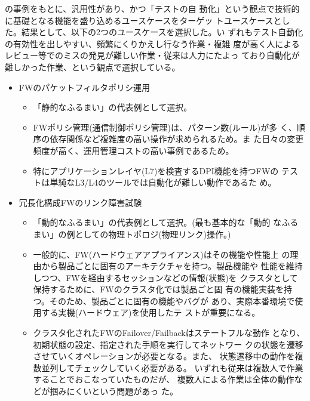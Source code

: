 の事例をもとに、汎用性があり、かつ「テストの自
動化」という観点で技術的に基礎となる機能を盛り込めるユースケースをターゲッ
トユースケースとした。結果として、以下の2つのユースケースを選択した。い
ずれもテスト自動化の有効性を出しやすい、頻繁にくりかえし行なう作業・複雑
度が高く人によるレビュー等でのミスの発見が難しい作業・従来は人力にたよっ
ており自動化が難しかった作業、という観点で選択している。
\begin{itemize}
 \item FWのパケットフィルタポリシ運用
       \begin{itemize}
        \item 「静的なふるまい」の代表例として選択。
        \item FWポリシ管理(通信制御ポリシ管理)は、パターン数(ルール)が多
              く、順序の依存関係など複雑度の高い操作が求められるため。ま
              た日々の変更頻度が高く、運用管理コストの高い事例であるため。
        \item 特にアプリケーションレイヤ(L7)を検査するDPI機能を持つFWの
              テストは単純なL3/L4のツールでは自動化が難しい動作であるた
              め。
       \end{itemize}
 \item 冗長化構成FWのリンク障害試験
       \begin{itemize}
        \item 「動的なふるまい」の代表例として選択。(最も基本的な「動的
              なふるまい」の例としての物理トポロジ(物理リンク)操作。)
        \item 一般的に、FW(ハードウェアアプライアンス)はその機能や性能上
              の理由から製品ごとに固有のアーキテクチャを持つ。製品機能や
              性能を維持しつつ、FWを経由するセッションなどの情報(状態)を
              クラスタとして保持するために、FWのクラスタ化では製品ごと固
              有の機能実装を持つ。そのため、製品ごとに固有の機能やバグが
              あり、実際本番環境で使用する実機(ハードウェア)を使用したテ
              ストが重要になる。
        \item クラスタ化されたFWのFailover/Failbackはステートフルな動作
              となり、初期状態の設定、指定された手順を実行してネットワー
              クの状態を遷移させていくオペレーションが必要となる。また、
              状態遷移中の動作を複数並列してチェックしていく必要がある。
              いずれも従来は複数人で作業することでおこなっていたものだが、
              複数人による作業は全体の動作などが掴みにくいという問題があっ
              た。
       \end{itemize}
\end{itemize}

